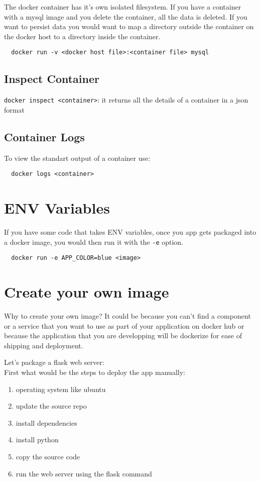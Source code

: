 \documentclass[french]{article}
\begin{document}
The docker container has it's own isolated filesystem. If you have a container with a mysql image and you delete the container, all the data is deleted. If you want to persist data you would want to map a directory outside the container on the docker host to a directory inside the container.
\begin{verbatim}
  docker run -v <docker host file>:<container file> mysql
\end{verbatim}

\subsection{Inspect Container}

\verb|docker inspect <container>|: it returns all the details of a container in a json format

\subsection{Container Logs}

To view the standart output of a container use:
\begin{verbatim}
  docker logs <container>
\end{verbatim}

\section{ENV Variables}

If you have some code that takes ENV variables, once you app gets packaged into a docker image, you would then run it with the \verb|-e| option.
\begin{verbatim}
  docker run -e APP_COLOR=blue <image>
\end{verbatim}

\section{Create your own image}

Why to create your own image? It could be because you can't find a component or a service that you want to use as part of your application on docker hub or because the application that you are developping will be dockerize for ease of shipping and deployment.

Let's package a flask web server:\\
First what would be the steps to deploy the app manually:
\begin{enumerate}
  \item  operating system like ubuntu
  \item update the source repo
  \item install dependencies
  \item install python
  \item copy the source code
  \item run the web server using the flask command 
\end{enumerate}$ $
\end{document}
